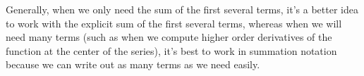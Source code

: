 \documentclass{ximera}
\begin{document}
\begin{exercise}
\begin{exercise}
Generally, when we only need the sum of the first several terms, it's
a better idea to work with the explicit sum of the first several terms,
whereas when we will need many terms (such as when we compute higher
order derivatives of the function at the center of the series), it's
best to work in summation notation because we can write out as many
terms as we need easily.

\end{exercise}
\end{exercise}
\end{document}
